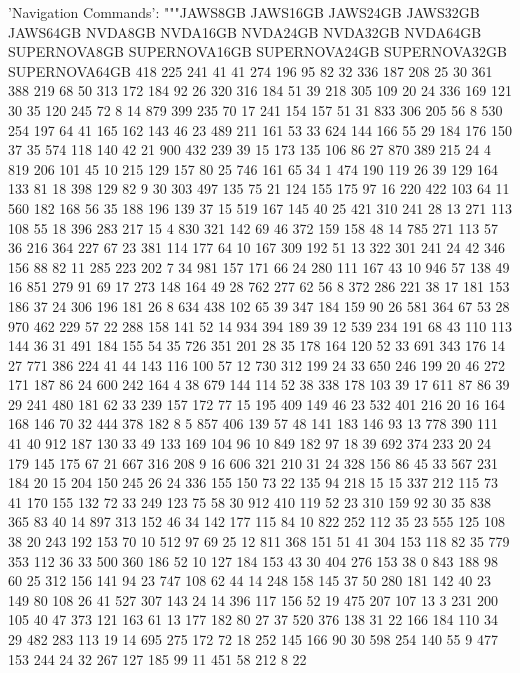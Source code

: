 \begin{pyverbatim}
{	'Navigation Commands': """JAWS8GB	JAWS16GB	JAWS24GB	JAWS32GB	JAWS64GB	NVDA8GB	NVDA16GB	NVDA24GB	NVDA32GB	NVDA64GB	SUPERNOVA8GB	SUPERNOVA16GB	SUPERNOVA24GB	SUPERNOVA32GB	SUPERNOVA64GB
	418	225	241	41	41	274	196	95	82	32	336	187	208	25	30
	361	388	219	68	50	313	172	184	92	26	320	316	184	51	39
	218	305	109	20	24	336	169	121	30	35	120	245	72	8	14
	879	399	235	70	17	241	154	157	51	31	833	306	205	56	8
	530	254	197	64	41	165	162	143	46	23	489	211	161	53	33
	624	144	166	55	29	184	176	150	37	35	574	118	140	42	21
	900	432	239	39	15	173	135	106	86	27	870	389	215	24	4
	819	206	101	45	10	215	129	157	80	25	746	161	65	34	1
	474	190	119	26	39	129	164	133	81	18	398	129	82	9	30
	303	497	135	75	21	124	155	175	97	16	220	422	103	64	11
	560	182	168	56	35	188	196	139	37	15	519	167	145	40	25
	421	310	241	28	13	271	113	108	55	18	396	283	217	15	4
	830	321	142	69	46	372	159	158	48	14	785	271	113	57	36
	216	364	227	67	23	381	114	177	64	10	167	309	192	51	13
	322	301	241	24	42	346	156	88	82	11	285	223	202	7	34
	981	157	171	66	24	280	111	167	43	10	946	57	138	49	16
	851	279	91	69	17	273	148	164	49	28	762	277	62	56	8
	372	286	221	38	17	181	153	186	37	24	306	196	181	26	8
	634	438	102	65	39	347	184	159	90	26	581	364	67	53	28
	970	462	229	57	22	288	158	141	52	14	934	394	189	39	12
	539	234	191	68	43	110	113	144	36	31	491	184	155	54	35
	726	351	201	28	35	178	164	120	52	33	691	343	176	14	27
	771	386	224	41	44	143	116	100	57	12	730	312	199	24	33
	650	246	199	20	46	272	171	187	86	24	600	242	164	4	38
	679	144	114	52	38	338	178	103	39	17	611	87	86	39	29
	241	480	181	62	33	239	157	172	77	15	195	409	149	46	23
	532	401	216	20	16	164	168	146	70	32	444	378	182	8	5
	857	406	139	57	48	141	183	146	93	13	778	390	111	41	40
	912	187	130	33	49	133	169	104	96	10	849	182	97	18	39
	692	374	233	20	24	179	145	175	67	21	667	316	208	9	16
	606	321	210	31	24	328	156	86	45	33	567	231	184	20	15
	204	150	245	26	24	336	155	150	73	22	135	94	218	15	15
	337	212	115	73	41	170	155	132	72	33	249	123	75	58	30
	912	410	119	52	23	310	159	92	30	35	838	365	83	40	14
	897	313	152	46	34	142	177	115	84	10	822	252	112	35	23
	555	125	108	38	20	243	192	153	70	10	512	97	69	25	12
	811	368	151	51	41	304	153	118	82	35	779	353	112	36	33
	500	360	186	52	10	127	184	153	43	30	404	276	153	38	0
	843	188	98	60	25	312	156	141	94	23	747	108	62	44	14
	248	158	145	37	50	280	181	142	40	23	149	80	108	26	41
	527	307	143	24	14	396	117	156	52	19	475	207	107	13	3
	231	200	105	40	47	373	121	163	61	13	177	182	80	27	37
	520	376	138	31	22	166	184	110	34	29	482	283	113	19	14
	695	275	172	72	18	252	145	166	90	30	598	254	140	55	9
	477	153	244	24	32	267	127	185	99	11	451	58	212	8	22
}
\end{pyverbatim}
